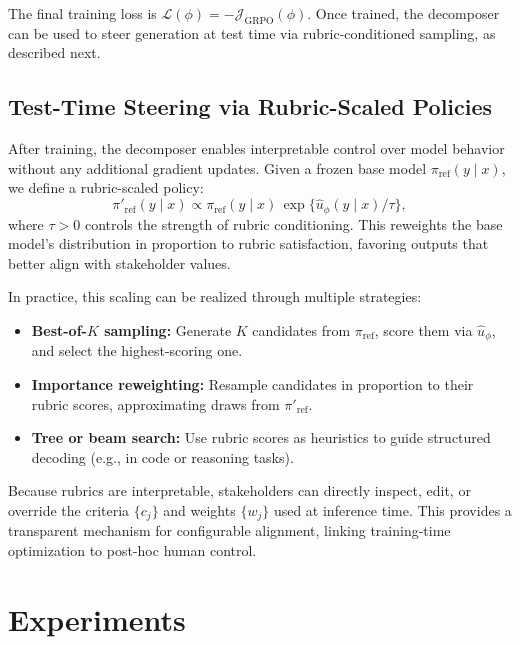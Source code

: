 \documentclass[sigconf]{acmart}
\begin{document}
\smallskip
\noindent
The final training loss is $\mathcal{L}(\phi) = -\mathcal{J}_{\mathrm{GRPO}}(\phi)$.
Once trained, the decomposer can be used to steer generation at test time
via rubric-conditioned sampling, as described next.


\subsection{Test-Time Steering via Rubric-Scaled Policies}
\label{sec:scaled-policy}

After training, the decomposer enables interpretable control over model behavior 
without any additional gradient updates.
Given a frozen base model $\pi_{\mathrm{ref}}(y \mid x)$, 
we define a rubric-scaled policy:
\begin{equation}
\pi'_{\mathrm{ref}}(y\mid x)
\propto
\pi_{\mathrm{ref}}(y\mid x)\,
\exp\!\big\{\hat{u}_\phi(y\mid x)/\tau\big\},
\label{eq:scaled-policy}
\end{equation}
where $\tau>0$ controls the strength of rubric conditioning.
This reweights the base model’s distribution in proportion to rubric satisfaction,
favoring outputs that better align with stakeholder values.

In practice, this scaling can be realized through multiple strategies:
\begin{itemize}
\item \textbf{Best-of-$K$ sampling:} 
Generate $K$ candidates from $\pi_{\mathrm{ref}}$, 
score them via $\hat{u}_\phi$, 
and select the highest-scoring one.
\item \textbf{Importance reweighting:} 
Resample candidates in proportion to their rubric scores, 
approximating draws from $\pi'_{\mathrm{ref}}$.
\item \textbf{Tree or beam search:} 
Use rubric scores as heuristics to guide structured decoding 
(e.g., in code or reasoning tasks).
\end{itemize}

Because rubrics are interpretable, stakeholders can directly 
inspect, edit, or override the criteria $\{c_j\}$ and weights $\{w_j\}$ used at inference time. 
This provides a transparent mechanism for configurable alignment, 
linking training-time optimization to post-hoc human control.


\section{Experiments}
\label{sec:experiments}
\end{document}
